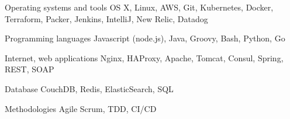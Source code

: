 
\begin{cvskills}

  \cvskill
    {Operating systems and tools} %
    {OS X, Linux, AWS, Git, Kubernetes, Docker, Terraform, Packer, Jenkins, IntelliJ, New Relic, Datadog} %

  \cvskill
    {Programming languages} %
    {Javascript (node.js), Java, Groovy, Bash, Python, Go} %

  \cvskill
    {Internet, web applications} %
    {Nginx, HAProxy, Apache, Tomcat, Consul, Spring, REST, SOAP} %

  \cvskill
    {Database} %
    {CouchDB, Redis, ElasticSearch, SQL} %

  \cvskill
    {Methodologies} %
    {Agile Scrum, TDD, CI/CD} %

\end{cvskills}